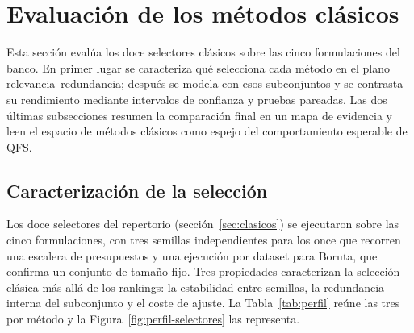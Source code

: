 \section{Evaluación de los métodos clásicos}

Esta sección evalúa los doce selectores clásicos sobre las cinco
formulaciones del banco. En primer lugar se caracteriza qué selecciona
cada método en el plano relevancia--redundancia; después se modela con
esos subconjuntos y se contrasta su rendimiento mediante intervalos de
confianza y pruebas pareadas. Las dos últimas subsecciones resumen la
comparación final en un mapa de evidencia y leen el espacio de métodos
clásicos como espejo del comportamiento esperable de QFS.

\subsection{Caracterización de la selección}

Los doce selectores del repertorio (sección~\ref{sec:clasicos}) se
ejecutaron sobre las cinco formulaciones, con tres semillas
independientes para los once que recorren una escalera de presupuestos y
una ejecución por dataset para Boruta, que confirma un conjunto de tamaño
fijo. Tres propiedades caracterizan la selección clásica más allá de los
rankings: la estabilidad entre semillas, la redundancia interna del
subconjunto y el coste de ajuste. La Tabla~\ref{tab:perfil} reúne las
tres por método y la Figura~\ref{fig:perfil-selectores} las representa.

